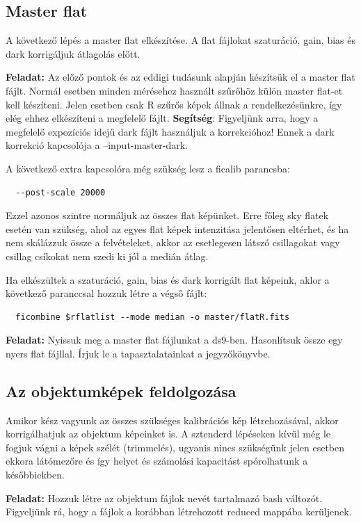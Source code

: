 \documentclass{article}
\begin{document}
\subsection{Master flat}

A következő lépés a master flat elkészítése. A flat fájlokat szaturáció, gain,
bias és dark korrigáljuk átlagolás előtt.

{\bf Feladat:}
Az előző pontok és az eddigi tudásunk alapján készítsük el a master flat fájlt.
Normál esetben minden mérésehez használt szűrőhöz külön master flat-et kell
készíteni. Jelen esetben csak R szűrős képek állnak a rendelkezésünkre, így elég
ehhez elkészíteni a megfelelő fájlt.
{\bf Segítség}:
Figyeljünk arra, hogy a megfelelő expozíciós idejű dark fájlt használjuk a
korrekcióhoz! Ennek a dark korrekció kapcsolója a --input-master-dark.

A következő extra kapcsolóra még szükség lesz a ficalib parancsba:
\begin{verbatim}
  --post-scale 20000
\end{verbatim}
Ezzel azonos szintre normáljuk az összes flat képünket. Erre főleg sky flatek
esetén van szükség, ahol az egyes flat képek intenzitása jelentősen eltérhet,
és ha nem skálázzuk össze a felvételeket, akkor az esetlegesen látszó csillagokat
vagy csillag csíkokat nem szedi ki jól a medián átlag.

Ha elkészültek a szaturáció, gain, bias és dark korrigált flat képeink, aklor a
következő paranccsal hozzuk létre a végső fájlt:

\begin{verbatim}
  ficombine $rflatlist --mode median -o master/flatR.fits
\end{verbatim}

{\bf Feladat:}
Nyissuk meg a master flat fájlunkat a ds9-ben. Hasonlítsuk össze egy nyers flat
fájllal. Írjuk le a tapasztalatainkat a jegyzőkönyvbe.


\subsection{Az objektumképek feldolgozása}

Amikor kész vagyunk az összes szükséges kalibrációs kép létrehozásával, akkor
korrigálhatjuk az objektum képeinket is. A sztenderd lépéseken kívül még le
fogjuk vágni a képek szélét (trimmelés), ugyanis nincs szükségünk jelen esetben
ekkora látómezőre és így helyet és számolási kapacitást spórolhatunk a
későbbiekben.

{\bf Feladat:}
Hozzuk létre az objektum fájlok nevét tartalmazó bash változót. Figyeljünk rá,
hogy a fájlok a korábban létrehozott reduced mappába kerüljenek.
\end{document}
